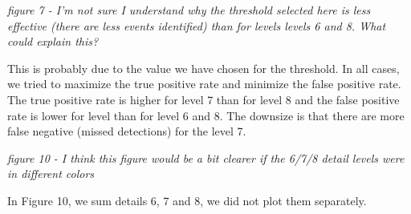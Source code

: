 \documentclass[letterpaper, 12pt]{article}
\begin{document}
\bigskip

\textit{figure 7 - I'm not sure I understand why the threshold selected here is less effective (there are less events identified) than for levels levels 6 and 8. What could explain this?}

\bigskip

This is probably due to the value we have chosen for the threshold. In all cases, we tried to maximize the true positive rate and minimize the false positive rate. The true positive rate is higher for level 7 than for level 8 and the false positive rate is lower for level than for level 6 and 8. The downsize is that there are more false negative (missed detections) for the level 7.

\bigskip

\textit{figure 10 - I think this figure would be a bit clearer if the 6/7/8 detail levels were in different colors}

\bigskip

In Figure 10, we sum details 6, 7 and 8, we did not plot them separately.
\end{document}
